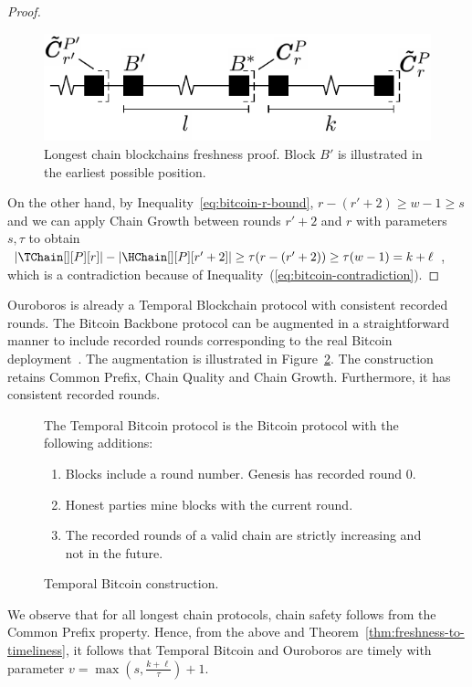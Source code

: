 \begin{proof}
  \begin{figure}
    \centering
    \includegraphics[width=0.5\columnwidth,keepaspectratio]{figures/longest-chain-proof.pdf}
    \caption{Longest chain blockchains freshness proof. Block $B'$ is illustrated in the
             earliest possible position.
    }
   \label{fig:longest-chain-freshness-proof}
  \end{figure}


  On the other hand, by Inequality~\ref{eq:bitcoin-r-bound}, $r - (r' + 2) \geq w - 1 \geq s$ and
  we can apply Chain Growth between rounds $r' + 2$ and $r$
  with parameters $s, \tau$ to obtain
  $|\TChain[][P][r]| - |\HChain[][P][r' + 2]| \geq \tau(r - (r' + 2)) \geq \tau (w - 1) =  k + \ell$,
  which is a contradiction because of Inequality~(\ref{eq:bitcoin-contradiction}).
  \Qed
\end{proof}

Ouroboros is already a Temporal Blockchain protocol with consistent recorded rounds.
The Bitcoin Backbone protocol can be augmented in a
straightforward manner to include recorded rounds
corresponding to the real Bitcoin deployment~\cite{mastering-bitcoin}.
The augmentation is illustrated in Figure~\ref{fig.temporal-backbone}.
The construction retains Common Prefix, Chain Quality and Chain Growth.
Furthermore, it has consistent recorded rounds.

\begin{figure}
  The Temporal Bitcoin protocol is the Bitcoin protocol with
  the following additions:

  \begin{enumerate}
    \item Blocks include a round number. Genesis has recorded round $0$.
    \item Honest parties mine blocks with the current round.
    \item The recorded rounds of a valid chain are strictly increasing and not in the future.
  \end{enumerate}
  \caption{Temporal Bitcoin construction.}
  \label{fig.temporal-backbone}
\end{figure}

We observe that for all longest chain protocols, chain safety follows from the
Common Prefix property. Hence, from the above and Theorem~\ref{thm:freshness-to-timeliness},
it follows that Temporal Bitcoin and
Ouroboros are timely with parameter $v = \max(s, \frac{k + \ell}{\tau}) + 1$.
